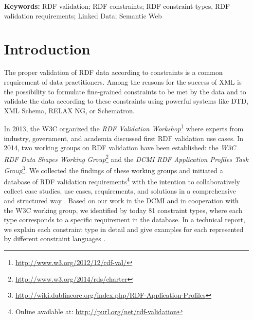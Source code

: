 \documentclass[a4paper,fontsize=11pt]{scrartcl}
\begin{document}
\hspace{-1.4em}
\textbf{Keywords:}
RDF validation; RDF constraints; RDF constraint types, RDF validation requirements; Linked Data; Semantic Web

\section{Introduction}

The proper validation of RDF data according to constraints is a common requirement of data practitioners. 
Among the reasons for the success of XML is the possibility to formulate fine-grained constraints to be met by the data and to validate the data according to these constraints using powerful systems like DTD, XML Schema, RELAX NG, or Schematron.

In 2013, the W3C organized the \emph{RDF Validation Workshop}\footnote{\url{http://www.w3.org/2012/12/rdf-val/}}
where experts from industry, government, and academia discussed first RDF validation use cases. 
In 2014, two working groups on RDF validation have been established: 
the \emph{W3C RDF Data Shapes Working Group}\footnote{\url{http://www.w3.org/2014/rds/charter}} and the \emph{DCMI RDF Application Profiles Task Group}\footnote{\url{http://wiki.dublincore.org/index.php/RDF-Application-Profiles}}. 
We collected the findings of these working groups and initiated a database of RDF validation requirements\footnote{Online available at: \url{http://purl.org/net/rdf-validation}}
with the intention to collaboratively collect case studies, use cases, requirements, and solutions in a comprehensive and structured way \cite{BoschEckert2014}. 
Based on our work in the DCMI and in cooperation with the W3C working group,
we identified by today 81 constraint types, where each type corresponds to a specific requirement in the database. In a technical report, we explain each constraint type in detail and give examples for each represented by different constraint languages \cite{BoschNolleAcarEckert2015}.
\end{document}
